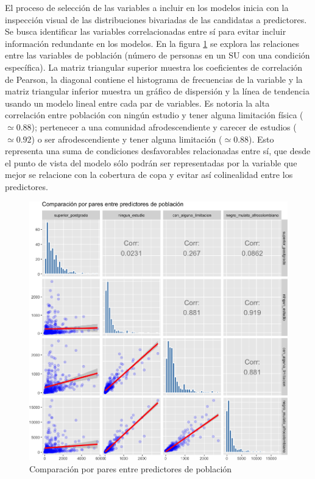 \documentclass[12pt,a4paper,openany]{book}
\theoremstyle{definition}
\theoremstyle{definition}
\theoremstyle{definition}
\theoremstyle{remark}
\begin{document}
El proceso de selección de las variables a incluir en los modelos inicia
con la inspección visual de las distribuciones bivariadas de las
candidatas a predictores. Se busca identificar las variables
correlacionadas entre sí para evitar incluir información redundante en
los modelos. En la figura \ref{fig:bivar-poblacion-abs} se explora las
relaciones entre las variables de población (número de personas en un SU
con una condición específica). La matriz triangular superior muestra los
coeficientes de correlación de Pearson, la diagonal contiene el
histograma de frecuencias de la variable y la matriz triangular inferior
muestra un gráfico de dispersión y la línea de tendencia usando un
modelo lineal entre cada par de variables. Es notoria la alta
correlación entre población con ningún estudio y tener alguna limitación
física (\(\simeq 0.88\)); pertenecer a una comunidad afrodescendiente y
carecer de estudios (\(\simeq0.92\)) o ser afrodescendiente y tener
alguna limitación (\(\simeq0.88\)). Esto representa una suma de
condiciones desfavorables relacionadas entre sí, que desde el punto de
vista del modelo sólo podrán ser representadas por la variable que mejor
se relacione con la cobertura de copa y evitar así colinealidad entre
los predictores.

\begin{figure}[H]

{\centering \includegraphics[width=1\linewidth]{tesis-unigis_files/figure-latex/bivar-poblacion-abs-1} 

}

\caption{Comparación por pares entre predictores de población}\label{fig:bivar-poblacion-abs}
\end{figure}
\end{document}

